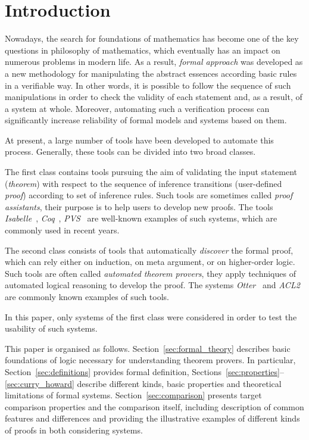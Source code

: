 \documentclass[article]{aaltoseries}
\begin{document}
\section{Introduction}

Nowadays, the search for foundations of mathematics has become one of the key questions in philosophy of mathematics, which eventually has an impact on numerous problems in modern life. As a result, \textit{formal approach} was developed as a new methodology for manipulating the abstract essences according basic rules in a verifiable way. In other words, it is possible to follow the sequence of such manipulations in order to check the validity of each statement and, as a result, of a system at whole. Moreover, automating such a verification process can significantly increase reliability of formal models and systems based on them.

At present, a large number of tools have been developed to automate this process. Generally, these tools can be divided into two broad classes. 

The first class contains tools pursuing the aim of validating the input statement (\textit{theorem}) with respect to the sequence of inference transitions (user-defined \textit{proof}) according to set of inference rules. Such tools are sometimes called \textit{proof assistants}, their purpose is to help users to develop new proofs. The tools \textit{Isabelle}~\cite{tool_Isabelle}, \textit{Coq}~\cite{tool_Coq}, \textit{PVS}~\cite{tool_Pvs} are well-known examples of such systems, which are commonly used in recent years.

The second class consists of tools that automatically \textit{discover} the formal proof, which can rely either on induction, on meta argument, or on higher-order logic. Such tools are often called \textit{automated theorem provers}, they apply techniques of automated logical reasoning to develop the proof. The systems \textit{Otter}~\cite{tool_Otter} and \textit{ACL2}~\cite{tool_Acl} are commonly known examples of such tools. 

In this paper, only systems of the first class were considered in order to test the usability of such systems.

This paper is organised as follows. Section~\ref{sec:formal_theory} describes basic foundations of logic necessary for understanding theorem provers. In particular, Section~\ref{sec:definitions} provides formal definition, Sections~\ref{sec:properties}--\ref{sec:curry_howard} describe different kinds, basic properties and theoretical limitations of formal systems.
Section~\ref{sec:comparison} presents target comparison properties and the comparison itself, including description of common features and differences and providing the illustrative examples of different kinds of proofs in both considering systems.
\end{document}

